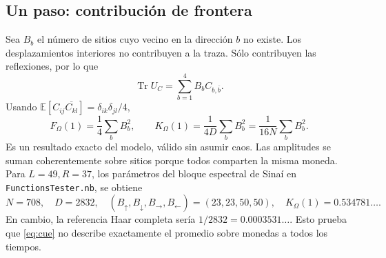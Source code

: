 \documentclass[11pt]{article}
\newcommand{\Tr}{\operatorname{Tr}}
\newcommand{\E}{\mathbb{E}}
\begin{document}
\subsection{Un paso: contribución de frontera}
Sea $B_b$ el número de sitios cuyo vecino en la dirección $b$ no existe.
Los desplazamientos interiores no contribuyen a la traza. Sólo
contribuyen las reflexiones, por lo que
\begin{equation}
 \Tr U_C=\sum_{b=1}^4 B_b C_{b,\bar b}.
\end{equation}
Usando $\E[C_{ij}\overline{C_{kl}}]=\delta_{ik}\delta_{jl}/4$,
\begin{equation}
 \boxed{F_\Omega(1)=\frac14\sum_b B_b^2,\qquad
 K_\Omega(1)=\frac1{4D}\sum_b B_b^2
            =\frac1{16N}\sum_b B_b^2.}
 \label{eq:k1}
\end{equation}
Es un resultado exacto del modelo, válido sin asumir caos. Las
amplitudes se suman coherentemente sobre sitios porque todos comparten
la misma moneda. Para $L=49,R=37$, los parámetros del bloque espectral
de Sinaí en \texttt{FunctionsTester.nb}, se obtiene
\begin{equation}
 N=708,\quad D=2832,\quad (B_\uparrow,B_\downarrow,B_\rightarrow,B_\leftarrow)
 =(23,23,50,50),\quad K_\Omega(1)=0.534781\ldots .
\end{equation}
En cambio, la referencia Haar completa sería $1/2832=0.0003531\ldots$.
Esto prueba que \eqref{eq:cue} no describe exactamente el promedio
sobre monedas a todos los tiempos.
\end{document}
